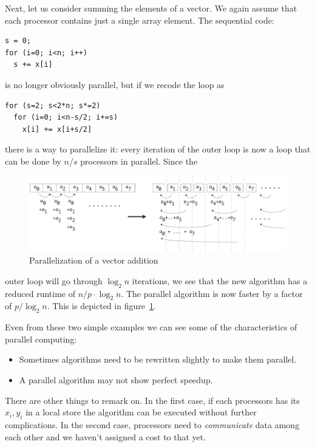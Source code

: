 Next, let us consider summing the elements of a vector. We again
assume that each processor contains just a single array element. The
sequential code:
\begin{verbatim}
s = 0;
for (i=0; i<n; i++)
  s += x[i]
\end{verbatim}
is no longer obviously parallel, but if we recode the loop as
\begin{verbatim}
for (s=2; s<2*n; s*=2)
  for (i=0; i<n-s/2; i+=s)
    x[i] += x[i+s/2]
\end{verbatim}
there is a way to parallelize it: every iteration of the outer loop is
now a loop that can be done by $n/s$ processors in parallel. Since the
\begin{figure}[ht]
  \includegraphics[scale=.13]{graphics/parallel-sum}
  \caption{Parallelization of a vector addition}
  \label{fig:par-sum}
\end{figure}
outer loop will go through $\log_2n$ iterations, we see that the new
algorithm has a reduced runtime of $n/p\cdot\log_2 n$. The parallel
algorithm is now faster by a factor of $p/\log_2n$. This is depicted
in figure~\ref{fig:par-sum}.

Even from these two simple examples we can see some of the
characteristics of parallel computing:
\begin{itemize}
\item Sometimes algorithms need to be rewritten slightly to make them
  parallel.
\item A parallel algorithm may not show perfect speedup.
\end{itemize}
There are other things to remark on. In the first case, if each
processors has its $x_i,y_i$ in a local store the
algorithm can be executed without further complications. In the second
case, processors need to \emph{communicate} data among each
other and we haven't assigned a cost to that yet.

